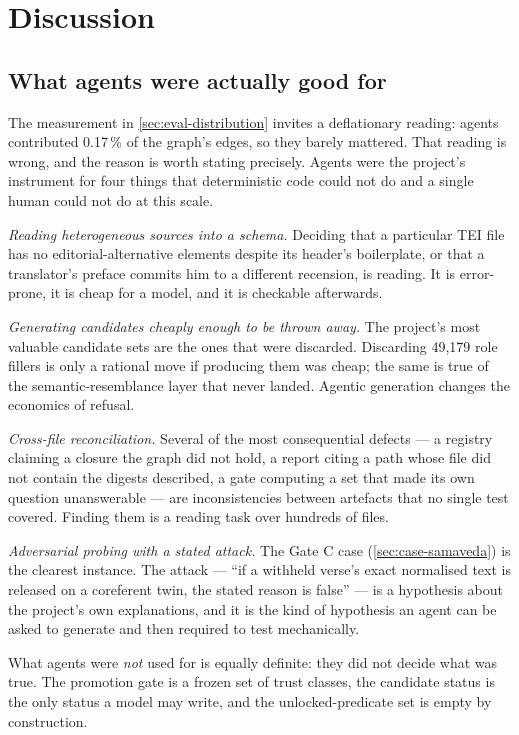 \section{Discussion}
\label{sec:discussion}

\subsection{What agents were actually good for}

The measurement in \cref{sec:eval-distribution} invites a deflationary reading:
agents contributed 0.17\,\% of the graph's edges, so they barely mattered. That
reading is wrong, and the reason is worth stating precisely. Agents were the
project's instrument for four things that deterministic code could not do and a
single human could not do at this scale.

\emph{Reading heterogeneous sources into a schema.} Deciding that a particular TEI
file has no editorial-alternative elements despite its header's boilerplate, or that
a translator's preface commits him to a different recension, is reading. It is
error-prone, it is cheap for a model, and it is checkable afterwards.

\emph{Generating candidates cheaply enough to be thrown away.} The project's most
valuable candidate sets are the ones that were discarded. Discarding 49{,}179 role
fillers is only a rational move if producing them was cheap; the same is true of the
semantic-resemblance layer that never landed. Agentic generation changes the
economics of refusal.

\emph{Cross-file reconciliation.} Several of the most consequential defects ---
a registry claiming a closure the graph did not hold, a report citing a path whose
file did not contain the digests described, a gate computing a set that made its own
question unanswerable --- are inconsistencies between artefacts that no single test
covered. Finding them is a reading task over hundreds of files.

\emph{Adversarial probing with a stated attack.} The Gate C case
(\cref{sec:case-samaveda}) is the clearest instance. The attack --- ``if a withheld
verse's exact normalised text is released on a coreferent twin, the stated reason is
false'' --- is a hypothesis about the project's own explanations, and it is the kind
of hypothesis an agent can be asked to generate and then required to test
mechanically.

What agents were \emph{not} used for is equally definite: they did not decide what
was true. The promotion gate is a frozen set of trust classes, the candidate status
is the only status a model may write, and the unlocked-predicate set is empty by
construction.

